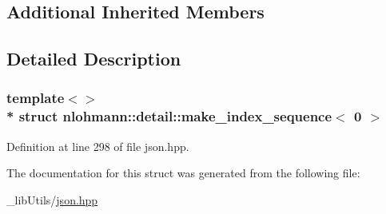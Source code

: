 \subsection*{Additional Inherited Members}


\subsection{Detailed Description}
\subsubsection*{template$<$$>$\\*
struct nlohmann\+::detail\+::make\+\_\+index\+\_\+sequence$<$ 0 $>$}



Definition at line 298 of file json.\+hpp.



The documentation for this struct was generated from the following file\+:\begin{DoxyCompactItemize}
\item 
\+\_\+lib\+Utils/\hyperlink{json_8hpp}{json.\+hpp}\end{DoxyCompactItemize}
